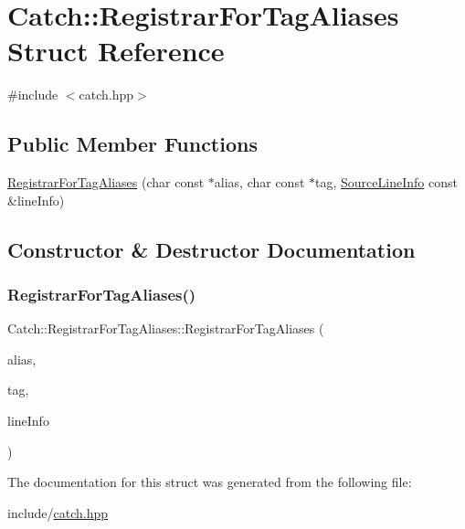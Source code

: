 \hypertarget{struct_catch_1_1_registrar_for_tag_aliases}{}\section{Catch\+::Registrar\+For\+Tag\+Aliases Struct Reference}
\label{struct_catch_1_1_registrar_for_tag_aliases}


{\ttfamily \#include $<$catch.\+hpp$>$}

\subsection*{Public Member Functions}
\begin{DoxyCompactItemize}
\item 
\mbox{\hyperlink{struct_catch_1_1_registrar_for_tag_aliases_ae4e45830e4763bcd65d55d8db9167b69}{Registrar\+For\+Tag\+Aliases}} (char const $\ast$alias, char const $\ast$tag, \mbox{\hyperlink{struct_catch_1_1_source_line_info}{Source\+Line\+Info}} const \&line\+Info)
\end{DoxyCompactItemize}


\subsection{Constructor \& Destructor Documentation}
\mbox{\label{struct_catch_1_1_registrar_for_tag_aliases_ae4e45830e4763bcd65d55d8db9167b69}} 
\subsubsection{\texorpdfstring{RegistrarForTagAliases()}{RegistrarForTagAliases()}}
{\footnotesize\ttfamily Catch\+::\+Registrar\+For\+Tag\+Aliases\+::\+Registrar\+For\+Tag\+Aliases (\begin{DoxyParamCaption}\item[{char const $\ast$}]{alias,  }\item[{char const $\ast$}]{tag,  }\item[{\mbox{\hyperlink{struct_catch_1_1_source_line_info}{Source\+Line\+Info}} const \&}]{line\+Info }\end{DoxyParamCaption})}



The documentation for this struct was generated from the following file\+:\begin{DoxyCompactItemize}
\item 
include/\mbox{\hyperlink{catch_8hpp}{catch.\+hpp}}\end{DoxyCompactItemize}
